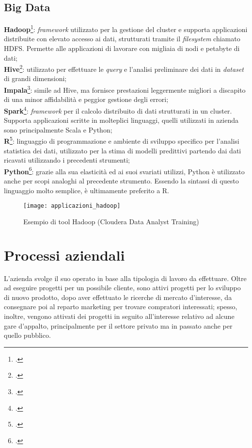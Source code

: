 \subsection{Big Data}
\textbf{Hadoop}\footcite{https://hadoop.apache.org/}: \textit{framework} utilizzato per la gestione del \gls{cluster} e supporta applicazioni distribuite con elevato accesso ai dati, strutturati tramite il \textit{filesystem} chiamato HDFS. Permette alle applicazioni di lavorare con migliaia di nodi e petabyte di dati;\\
\textbf{Hive}\footcite{https://hive.apache.org/}: utilizzato per effettuare le \textit{query} e l'analisi preliminare dei dati in \textit{dataset} di grandi dimensioni;\\
\textbf{Impala}\footcite{https://impala.apache.org/}: simile ad Hive, ma fornisce prestazioni leggermente migliori a discapito di una minor affidabilità e peggior gestione degli errori; \\
\textbf{Spark}\footcite{https://spark.apache.org/}: \textit{framework} per il calcolo distribuito di dati strutturati in un \gls{cluster}. Supporta applicazioni scritte in molteplici linguaggi, quelli utilizzati in azienda sono principalmente Scala e Python;\\
\textbf{R}\footcite{https://www.r-project.org/}: linguaggio di programmazione e ambiente di sviluppo specifico per l'analisi statistica dei dati, utilizzato per la stima di modelli predittivi partendo dai dati ricavati utilizzando i precedenti strumenti;\\
\textbf{Python}\footcite{https://www.python.org/}: grazie alla sua elasticità ed ai suoi svariati utilizzi, Python è utilizzato anche per scopi analoghi al precedente strumento. Essendo la sintassi di questo linguaggio molto semplice, è ultimamente preferito a R.\\
\begin{figure}[!h] 
	\centering 
	\texttt{[image: applicazioni\_hadoop]} 
	\caption{Esempio di tool Hadoop (Cloudera Data Analyst Training)}
\end{figure}

\newpage
\section{Processi aziendali}

L'azienda svolge il suo operato in base alla tipologia di lavoro da effettuare. Oltre ad eseguire progetti per un possibile cliente, sono attivi progetti per lo sviluppo di nuovo prodotto, dopo aver effettuato le ricerche di mercato d'interesse, da consegnare poi al reparto marketing per trovare compratori interessati; spesso, inoltre, vengono attivati dei progetti in seguito all'interesse relativo ad alcune gare d'appalto, principalmente per il settore privato ma in passato anche per quello pubblico.

